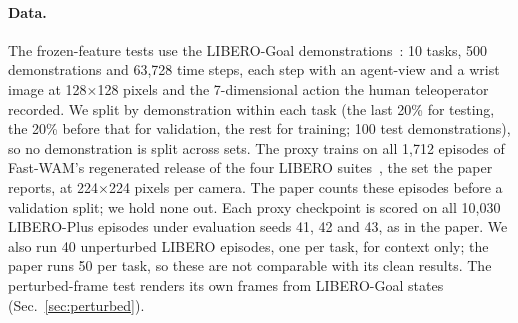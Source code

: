 \paragraph{Data.}
The frozen-feature tests use the LIBERO-Goal demonstrations~\cite{liu2023libero}: 10 tasks, 500 demonstrations and 63,728 time steps, each step with an agent-view and a wrist image at 128$\times$128 pixels and the 7-dimensional action the human teleoperator recorded.
We split by demonstration within each task (the last 20\% for testing, the 20\% before that for validation, the rest for training; 100 test demonstrations), so no demonstration is split across sets.
The proxy trains on all 1,712 episodes of Fast-WAM's regenerated release of the four LIBERO suites~, the set the paper reports, at 224$\times$224 pixels per camera.
The paper counts these episodes before a validation split; we hold none out.
Each proxy checkpoint is scored on all 10,030 LIBERO-Plus episodes under evaluation seeds 41, 42 and 43, as in the paper.
We also run 40 unperturbed LIBERO episodes, one per task, for context only; the paper runs 50 per task, so these are not comparable with its clean results.
The perturbed-frame test renders its own frames from LIBERO-Goal states (Sec.~\ref{sec:perturbed}).

